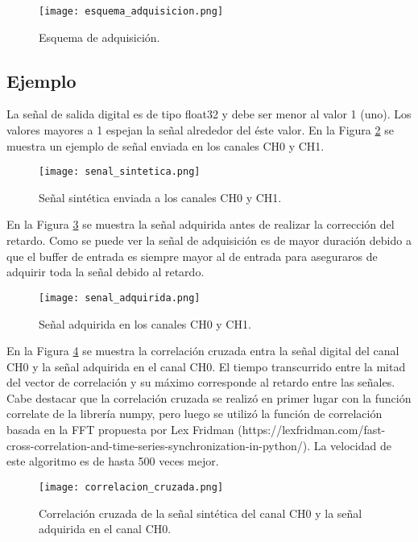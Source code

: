 \documentclass[a4paper, 11pt]{article}
\begin{document}
\begin{figure} [H]
\centering
\texttt{[image: esquema\_adquisicion.png]}
\caption{Esquema de adquisición. \label{fig:esquema_adquisiciona}}
\end{figure} 


\subsection*{Ejemplo}
La señal de salida digital es de tipo float32 y debe ser menor al valor 1 (uno). Los valores mayores a 1 espejan la señal alrededor del éste valor. En la Figura \ref{fig:senal_sintetica} se muestra un ejemplo de señal enviada en los canales CH0 y CH1. 

\begin{figure} [H]
\centering
\texttt{[image: senal\_sintetica.png]}
\caption{Señal sintética enviada a los canales CH0 y CH1. \label{fig:senal_sintetica}}
\end{figure} 

En la Figura \ref{fig:senal_adquirida} se muestra la señal adquirida antes de realizar la corrección del retardo. Como se puede ver la señal de adquisición es de mayor duración debido a que el buffer de entrada es siempre mayor al de entrada para aseguraros de adquirir toda la señal debido al retardo.


\begin{figure} [H]
\centering
\texttt{[image: senal\_adquirida.png]}
\caption{Señal adquirida en los canales CH0 y CH1. \label{fig:senal_adquirida}}
\end{figure} 

En la Figura \ref{fig:correlacion_cruzada} se muestra la correlación cruzada entra la señal digital del canal CH0 y la señal adquirida en el canal CH0. El tiempo transcurrido entre la mitad del vector de correlación y su máximo corresponde al retardo entre las señales. Cabe destacar que la correlación cruzada se realizó en primer lugar con la función correlate de la librería numpy, pero luego se utilizó la función de correlación basada en la FFT propuesta por Lex Fridman (https://lexfridman.com/fast-cross-correlation-and-time-series-synchronization-in-python/). La velocidad de este algoritmo es de hasta 500 veces mejor. 
 
\begin{figure} [H]
\centering
\texttt{[image: correlacion\_cruzada.png]}
\caption{Correlación cruzada de la señal sintética del canal CH0 y la señal adquirida en el canal CH0.\label{fig:correlacion_cruzada}}
\end{figure} 
\end{document}
